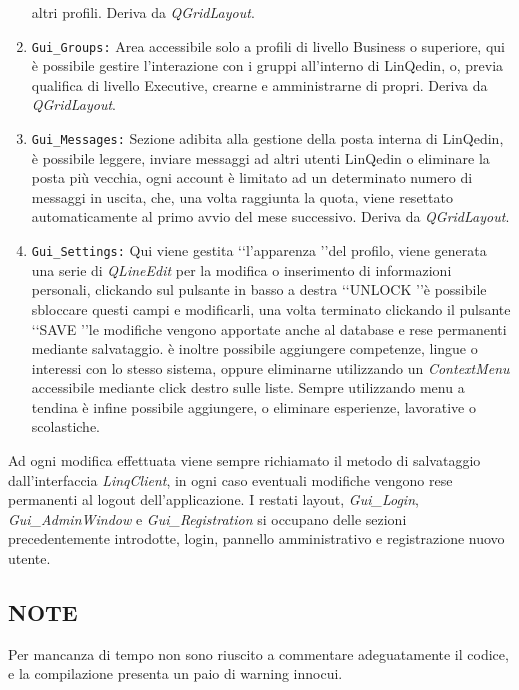 \begin{enumerate}
    altri profili. Deriva da \textit{QGridLayout}.
    \item
    \texttt{Gui\_Groups:} Area accessibile solo a profili di livello Business o superiore, qui è possibile gestire l'interazione con i gruppi all'interno di LinQedin, o, previa qualifica di livello Executive,
    crearne e amministrarne di propri. Deriva da \textit{QGridLayout}.
    \item
    \texttt{Gui\_Messages:} Sezione adibita alla gestione della posta interna di LinQedin, è possibile leggere, inviare messaggi ad altri utenti LinQedin o eliminare la posta più vecchia, ogni account è limitato
    ad un determinato numero di messaggi in uscita, che, una volta raggiunta la quota, viene resettato automaticamente al primo avvio del mese successivo. Deriva da \textit{QGridLayout}.
    \item
    \texttt{Gui\_Settings:} Qui viene gestita \lq\lq l'apparenza \rq\rq del profilo, viene generata una serie di \textit{QLineEdit} per la modifica o inserimento di informazioni personali, clickando sul pulsante in basso
    a destra \lq\lq UNLOCK \rq\rq è possibile sbloccare questi campi e modificarli, una volta terminato clickando il pulsante \lq\lq SAVE \rq\rq le modifiche vengono apportate anche al database e rese permanenti mediante
    salvataggio.
    è inoltre possibile aggiungere competenze, lingue o interessi con lo stesso sistema, oppure eliminarne utilizzando un \textit{ContextMenu} accessibile mediante click destro sulle liste. Sempre utilizzando menu a tendina
    è infine possibile aggiungere, o eliminare esperienze, lavorative o scolastiche.
\end{enumerate}
Ad ogni modifica effettuata viene sempre richiamato il metodo di salvataggio dall'interfaccia \textit{LinqClient}, in ogni caso eventuali modifiche vengono rese permanenti al logout dell'applicazione.
I restati layout, \textit{Gui\_Login}, \textit{Gui\_AdminWindow} e \textit{Gui\_Registration} si occupano delle sezioni precedentemente introdotte, login, pannello amministrativo e registrazione nuovo utente.
\subsection*{NOTE}
Per mancanza di tempo non sono riuscito a commentare adeguatamente il codice, e la compilazione presenta un paio di warning innocui.